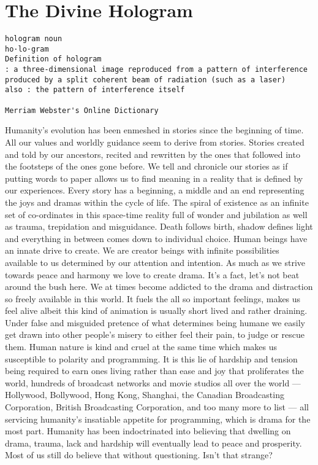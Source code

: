 \section{The Divine Hologram}\label{the-divine-hologram}

\begin{verbatim}
hologram noun
ho·​lo·​gram
Definition of hologram
: a three-dimensional image reproduced from a pattern of interference produced by a split coherent beam of radiation (such as a laser)
also : the pattern of interference itself

Merriam Webster's Online Dictionary
\end{verbatim}

Humanity's evolution has been enmeshed in stories since the beginning of
time. All our values and worldly guidance seem to derive from stories.
Stories created and told by our ancestors, recited and rewritten by the
ones that followed into the footsteps of the ones gone before. We tell
and chronicle our stories as if putting words to paper allows us to find
meaning in a reality that is defined by our experiences. Every story has
a beginning, a middle and an end representing the joys and dramas within
the cycle of life. The spiral of existence as an infinite set of
co-ordinates in this space-time reality full of wonder and jubilation as
well as trauma, trepidation and misguidance. Death follows birth, shadow
defines light and everything in between comes down to individual choice.
Human beings have an innate drive to create. We are creator beings with
infinite possibilities available to us determined by our attention and
intention. As much as we strive towards peace and harmony we love to
create drama. It's a fact, let's not beat around the bush here. We at
times become addicted to the drama and distraction so freely available
in this world. It fuels the all so important feelings, makes us feel
alive albeit this kind of animation is usually short lived and rather
draining. Under false and misguided pretence of what determines being
humane we easily get drawn into other people's misery to either feel
their pain, to judge or rescue them. Human nature is kind and cruel at
the same time which makes us susceptible to polarity and programming. It
is this lie of hardship and tension being required to earn ones living
rather than ease and joy that proliferates the world, hundreds of
broadcast networks and movie studios all over the world --- Hollywood,
Bollywood, Hong Kong, Shanghai, the Canadian Broadcasting Corporation,
British Broadcasting Corporation, and too many more to list --- all
servicing humanity's insatiable appetite for programming, which is drama
for the most part. Humanity has been indoctrinated into believing that
dwelling on drama, trauma, lack and hardship will eventually lead to
peace and prosperity. Most of us still do believe that without
questioning. Isn't that strange?

